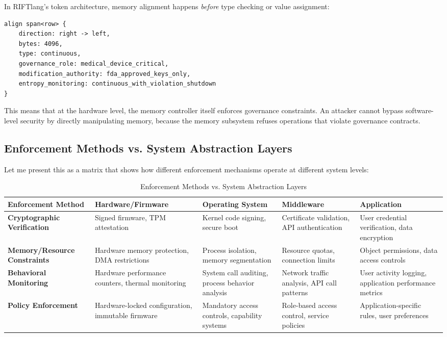In RIFTlang's token architecture, memory alignment happens \textit{before} type checking or value assignment:

\begin{lstlisting}[language=rift]
align span<row> {
    direction: right -> left,
    bytes: 4096,
    type: continuous,
    governance_role: medical_device_critical,
    modification_authority: fda_approved_keys_only,
    entropy_monitoring: continuous_with_violation_shutdown
}
\end{lstlisting}

This means that at the hardware level, the memory controller itself enforces governance constraints. An attacker cannot bypass software-level security by directly manipulating memory, because the memory subsystem refuses operations that violate governance contracts.

\subsection{Enforcement Methods vs. System Abstraction Layers}

Let me present this as a matrix that shows how different enforcement mechanisms operate at different system levels:

\begin{table}[h]
\centering
\begin{tabular}{|p{3cm}|p{2.8cm}|p{2.8cm}|p{2.8cm}|p{2.8cm}|}
\hline
\textbf{Enforcement Method} & \textbf{Hardware/Firmware} & \textbf{Operating System} & \textbf{Middleware} & \textbf{Application} \\
\hline
\textbf{Cryptographic Verification} & 
Signed firmware, TPM attestation &
Kernel code signing, secure boot &
Certificate validation, API authentication &
User credential verification, data encryption \\
\hline
\textbf{Memory/Resource Constraints} &
Hardware memory protection, DMA restrictions &
Process isolation, memory segmentation &
Resource quotas, connection limits &
Object permissions, data access controls \\
\hline
\textbf{Behavioral Monitoring} &
Hardware performance counters, thermal monitoring &
System call auditing, process behavior analysis &
Network traffic analysis, API call patterns &
User activity logging, application performance metrics \\
\hline
\textbf{Policy Enforcement} &
Hardware-locked configuration, immutable firmware &
Mandatory access controls, capability systems &
Role-based access control, service policies &
Application-specific rules, user preferences \\
\hline
\end{tabular}
\caption{Enforcement Methods vs. System Abstraction Layers}
\label{tab:enforcement_methods}
\end{table}

